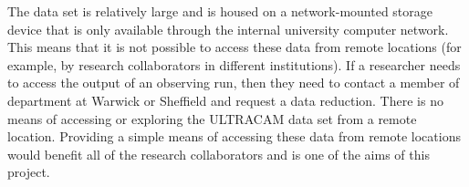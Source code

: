 The data set is relatively large and is housed on a network-mounted storage device that is only available through the internal university computer network. This means that it is not possible to access these data from remote locations (for example, by research collaborators in different institutions). If a researcher needs to access the output of an observing run, then they need to contact a member of department at Warwick or Sheffield and request a data reduction. There is no means of accessing or exploring the ULTRACAM data set from a remote location. Providing a simple means of accessing these data from remote locations would benefit all of the research collaborators and is one of the aims of this project.
